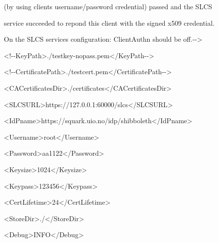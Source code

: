 \documentclass{article}
\begin{document}
{\ttfamily\color{black}
\ (by using client{\textquotesingle}s username/password credential)
passed and the SLCS}

{\ttfamily\color{black}
\ service succeeded to repond this client with the signed x509
credential.}

{\ttfamily\color{black}
\ On the SLCS service{\textquotesingle}s configuration: ClientAuthn
should be off.-{}-{\textgreater}}

{\ttfamily\color{black}
\ {\textless}!-{}-KeyPath{\textgreater}./testkey-nopass.pem{\textless}/KeyPath-{}-{\textgreater}}

{\ttfamily\color{black}
\ {\textless}!-{}-CertificatePath{\textgreater}./testcert.pem{\textless}/CertificatePath-{}-{\textgreater}}

{\ttfamily\color{black}
\ {\textless}CACertificatesDir{\textgreater}./certificates{\textless}/CACertificatesDir{\textgreater}}

{\ttfamily\color{black}
\ {\textless}SLCSURL{\textgreater}https://127.0.0.1:60000/slcs{\textless}/SLCSURL{\textgreater}}

{\ttfamily\color{black}
\ {\textless}IdPname{\textgreater}https://squark.uio.no/idp/shibboleth{\textless}/IdPname{\textgreater}}

{\ttfamily\color{black}
\ {\textless}Username{\textgreater}root{\textless}/Username{\textgreater}}

{\ttfamily\color{black}
\ {\textless}Password{\textgreater}aa1122{\textless}/Password{\textgreater}}

{\ttfamily\color{black}
\ {\textless}Keysize{\textgreater}1024{\textless}/Keysize{\textgreater}}

{\ttfamily\color{black}
\ {\textless}Keypass{\textgreater}123456{\textless}/Keypass{\textgreater}}

{\ttfamily\color{black}
\ {\textless}CertLifetime{\textgreater}24{\textless}/CertLifetime{\textgreater}}

{\ttfamily\color{black}
\ {\textless}StoreDir{\textgreater}./{\textless}/StoreDir{\textgreater}}

{\ttfamily\color{black}
\ {\textless}Debug{\textgreater}INFO{\textless}/Debug{\textgreater}}
\end{document}
